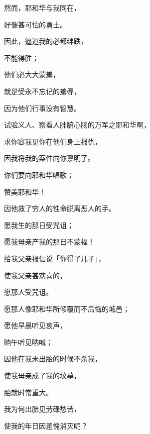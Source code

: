 {\par }{\Q {}然而，耶和华与我同在，
\par }{\Q 好像甚可怕的勇士。
\par }{\Q 因此，逼迫我的必都绊跌，
\par }{\Q 不能得胜；
\par }{\Q 他们必大大蒙羞，
\par }{\Q 就是受永不忘记的羞辱，
\par }{\Q 因为他们行事没有智慧。
\par }{\Q {}试验义人、察看人肺腑心肠的万军之耶和华啊，
\par }{\Q 求你容我见你在他们身上报仇，
\par }{\Q 因我将我的案件向你禀明了。
\par }{\BB \par }{\Q {}你们要向耶和华唱歌；
\par }{\Q 赞美耶和华！
\par }{\Q 因他救了穷人的性命脱离恶人的手。
\par }{\BB \par }{\Q {}愿我生的那日受咒诅；
\par }{\Q 愿我母亲产我的那日不蒙福！
\par }{\Q {}给我父亲报信说「你得了儿子」，
\par }{\Q 使我父亲甚欢喜的，
\par }{\Q 愿那人受咒诅。
\par }{\Q {}愿那人像耶和华所倾覆而不后悔的城邑；
\par }{\Q 愿他早晨听见哀声，
\par }{\Q 晌午听见呐喊；
\par }{\Q {}因他在我未出胎的时候不杀我，
\par }{\Q 使我母亲成了我的坟墓，
\par }{\Q 胎就时常重大。
\par }{\Q {}我为何出胎见劳碌愁苦，
\par }{\Q 使我的年日因羞愧消灭呢？

}
